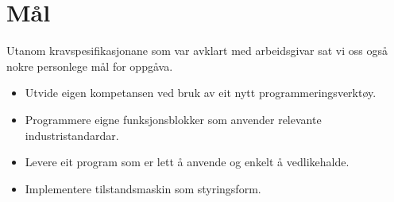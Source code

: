 \section{Mål}
Utanom kravspesifikasjonane som var avklart med arbeidsgivar sat vi oss
også nokre personlege mål for oppgåva.

\begin{itemize}
    \item Utvide eigen kompetansen ved bruk av eit nytt programmeringsverktøy.
    \item Programmere eigne funksjonsblokker som anvender relevante industristandardar.
    \item Levere eit program som er lett å anvende og enkelt å vedlikehalde.
    \item Implementere tilstandsmaskin som styringsform.
\end{itemize}


